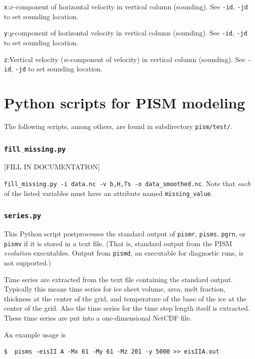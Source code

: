 \documentclass[11pt,final]{amsart}
\newcommand{\und}{$\underline{\,\,\,}$}
\begin{document}
\verb|x|:\quad $x$-component of horizontal velocity in vertical column (sounding).  See \verb|-id|, \verb|-jd| to set sounding location.

\verb|y|:\quad $y$-component of horizontal velocity in vertical column (sounding).  See \verb|-id|, \verb|-jd| to set sounding location.

\verb|z|:\quad Vertical velocity ($w$-component of velocity) in vertical column (sounding).  See \verb|-id|, \verb|-jd| to set sounding location.



\clearpage \newpage
\section{Python scripts for PISM modeling}\label{sect:scripts}

The following scripts, among others, are found in subdirectory \verb|pism/test/|.

\subsubsection*{\Large{\texttt{fill\und missing.py}}}  [FILL IN DOCUMENTATION]

\verb|fill_missing.py -i data.nc -v b,H,Ts -o data_smoothed.nc|.  Note that \emph{each} of the listed variables must have an attribute named \verb|missing_value|.


\subsubsection*{\Large{\texttt{series.py}}}  This Python script postprocesses the standard output of \verb|pismr|, \verb|pisms|, \verb|pgrn|, or \verb|pismv| if it is stored in a text file.  (That is, standard output from the PISM \emph{evolution} executables.  Output from \verb|pismd|, an executable for diagnostic runs, is not supported.)

Time series are extracted from the text file containing the standard output.  Typically this means time series for ice sheet volume, area, melt fraction, thickness at the center of the grid, and temperature of the base of the ice at the center of the grid.  Also the time series for the time step length itself is extracted.  These time series are put into a one-dimensional NetCDF file.

An example usage is

\verb|$  pisms -eisII A -Mx 61 -My 61 -Mz 201 -y 5000 >> eisIIA.out|
\end{document}
